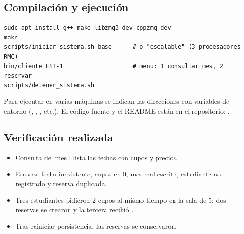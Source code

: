 \subsection{Compilación y ejecución}

\begin{lstlisting}
sudo apt install g++ make libzmq3-dev cppzmq-dev
make
scripts/iniciar_sistema.sh base      # o "escalable" (3 procesadores RMC)
bin/cliente EST-1                    # menu: 1 consultar mes, 2 reservar
scripts/detener_sistema.sh
\end{lstlisting}

Para ejecutar en varias máquinas se indican las direcciones con variables de
entorno (, ,
, etc.). El código fuente y el README están en el
repositorio: \repositorio.

\subsection{Verificación realizada}

\begin{itemize}
    \item Consulta del mes : lista las fechas con cupos y precios.
    \item Errores: fecha inexistente, cupos en 0, mes mal escrito, estudiante no
          registrado y reserva duplicada.
    \item Tres estudiantes pidieron 2 cupos al mismo tiempo en la sala de 5: dos
          reservas se crearon y la tercera recibió .
    \item Tras reiniciar persistencia, las reservas se conservaron.
\end{itemize}
